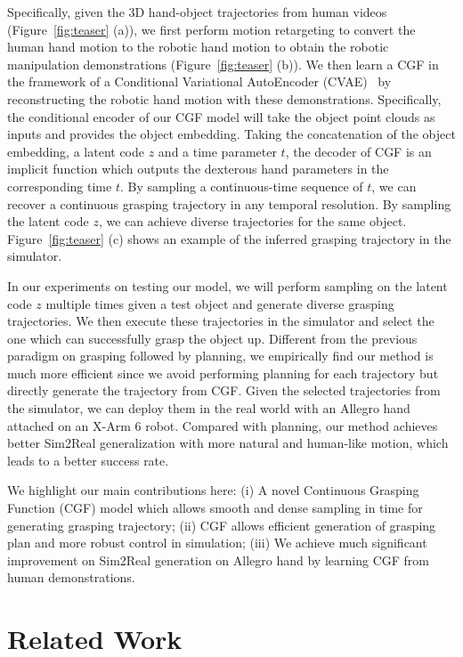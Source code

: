 \documentclass[letterpaper, 10 pt, journal, twoside]{IEEEtran}
\begin{document}
Specifically, given the 3D hand-object trajectories from human videos (Figure~\ref{fig:teaser} (a)), we first perform motion retargeting to convert the human hand motion to the robotic hand motion to obtain the robotic manipulation demonstrations (Figure~\ref{fig:teaser} (b)). We then learn a CGF in the framework of a Conditional Variational AutoEncoder (CVAE)~\cite{Sohn2015LearningSO} by reconstructing the robotic hand motion with these demonstrations. Specifically, the conditional encoder of our CGF model will take the object point clouds as inputs and provides the object embedding. Taking the concatenation of the object embedding, a latent code $z$ and a time parameter $t$, the decoder of CGF is an implicit function which outputs the dexterous hand parameters in the corresponding time $t$. By sampling a continuous-time sequence of $t$, we can recover a continuous grasping trajectory in any temporal resolution. By sampling the latent code $z$, we can achieve diverse trajectories for the same object.  Figure~\ref{fig:teaser} (c) shows an example of the inferred grasping trajectory in the simulator.

In our experiments on testing our model, we will perform sampling on the latent code $z$ multiple times given a test object and generate diverse grasping trajectories. We then execute these trajectories in the simulator and select the one which can successfully grasp the object up. Different from the previous paradigm on grasping followed by planning, we empirically find our method is much more efficient since we avoid performing planning for each trajectory but directly generate the trajectory from CGF. Given the selected trajectories from the simulator, we can deploy them in the real world with an Allegro hand attached on an X-Arm 6 robot. Compared with planning, our method achieves better Sim2Real generalization with more natural and human-like motion, which leads to a better success rate.




We highlight our main contributions here: (i) A novel Continuous Grasping Function (CGF) model which allows smooth and dense sampling in time for generating grasping trajectory; (ii) CGF allows efficient generation of grasping plan and more robust control in simulation; (iii) We achieve much significant improvement on Sim2Real generation on Allegro hand by learning CGF from human demonstrations.


\vspace{-0.05in}
\section{Related Work}
\label{sec:related}
\end{document}
